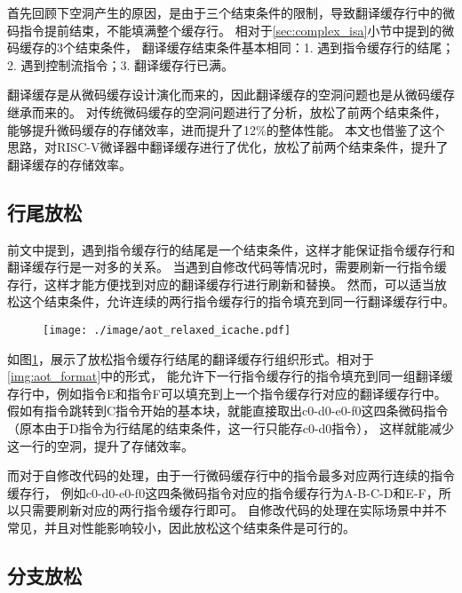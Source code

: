 首先回顾下空洞产生的原因，是由于三个结束条件的限制，导致翻译缓存行中的微码指令提前结束，不能填满整个缓存行。
相对于\ref{sec:complex_isa}小节中提到的微码缓存的3个结束条件，
翻译缓存结束条件基本相同：1. 遇到指令缓存行的结尾；2. 遇到控制流指令；3. 翻译缓存行已满。


翻译缓存是从微码缓存设计演化而来的，因此翻译缓存的空洞问题也是从微码缓存继承而来的。
\cite{kotraImprovingUtilizationMicrooperation2020}
对传统微码缓存的空洞问题进行了分析，放松了前两个结束条件，能够提升微码缓存的存储效率，进而提升了12\%的整体性能。
本文也借鉴了这个思路，对RISC-V微译器中翻译缓存进行了优化，放松了前两个结束条件，提升了翻译缓存的存储效率。

\subsection{行尾放松}

前文中提到，遇到指令缓存行的结尾是一个结束条件，这样才能保证指令缓存行和翻译缓存行是一对多的关系。
当遇到自修改代码等情况时，需要刷新一行指令缓存行，这样才能方便找到对应的翻译缓存行进行刷新和替换。
然而，可以适当放松这个结束条件，允许连续的两行指令缓存行的指令填充到同一行翻译缓存行中。

\begin{figure}[!htbp]
    \centering
    \texttt{[image: ./image/aot\_relaxed\_icache.pdf]}
    \label{img:aot_relaxed_icache}
  \end{figure}

如图\ref{img:aot_relaxed_icache}，展示了放松指令缓存行结尾的翻译缓存行组织形式。相对于\ref{img:aot_format}中的形式，
能允许下一行指令缓存行的指令填充到同一组翻译缓存行中，例如指令E和指令F可以填充到上一个指令缓存行对应的翻译缓存行中。
假如有指令跳转到C指令开始的基本块，就能直接取出c0-d0-e0-f0这四条微码指令（原本由于D指令为行结尾的结束条件，这一行只能存c0-d0指令），
这样就能减少这一行的空洞，提升了存储效率。

而对于自修改代码的处理，由于一行微码缓存行中的指令最多对应两行连续的指令缓存行，
例如c0-d0-e0-f0这四条微码指令对应的指令缓存行为A-B-C-D和E-F，所以只需要刷新对应的两行指令缓存行即可。
自修改代码的处理在实际场景中并不常见，并且对性能影响较小，因此放松这个结束条件是可行的。

\subsection{分支放松}

